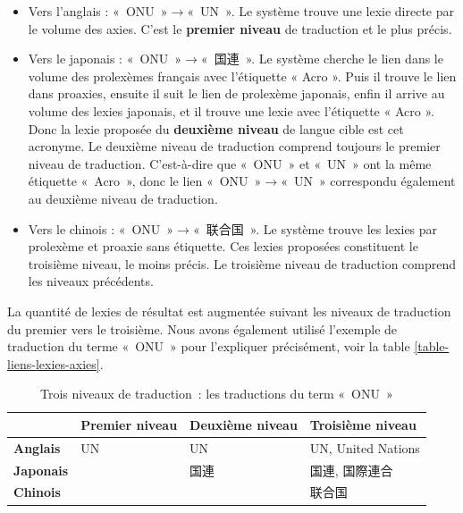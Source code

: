 \documentclass[10pt,a4paper,twoside]{article}
\newcommand{\Chinois}[1]{{\fontspec[Scale=0.9]{STSong}#1}}
\newcommand{\Japonais}[1]{{\fontspec[Scale=0.9]{Hiragino Kaku Gothic Pro}#1}}
\begin{document}
\begin{itemize}
\item Vers l’anglais : « ONU »\ensuremath{\to}« UN ». Le système trouve une lexie directe par le volume des axies. C’est le \textbf{premier niveau} de traduction et le plus précis.
\item Vers le japonais : « ONU »\ensuremath{\to}« \Japonais{国連} ». Le système cherche le lien dans le volume des prolexèmes français avec l’étiquette « Acro ». Puis il trouve le lien dans proaxies, ensuite il suit le lien de prolexème japonais, enfin il arrive au volume des lexies japonais, et il trouve une lexie avec l’étiquette « Acro ». Donc la lexie proposée du \textbf{deuxième niveau} de langue cible est cet acronyme. Le deuxième niveau de traduction comprend toujours le premier niveau de traduction. C'est-à-dire que « ONU » et « UN » ont la même étiquette « Acro », donc le lien « ONU »\ensuremath{\to}« UN » correspondu également au deuxième niveau de traduction.
\item Vers le chinois : « ONU »\ensuremath{\to}« \Chinois{联合国} ». Le système trouve les lexies par prolexème et proaxie sans étiquette. Ces lexies proposées constituent le troisième niveau, le moins précis. Le troisième niveau de traduction comprend les niveaux précédents.
\end{itemize}
La quantité de lexies de résultat est augmentée suivant les niveaux de traduction du premier vers le troisième. Nous avons également utilisé l'exemple de traduction du terme « ONU » pour l'expliquer précisément, voir la table \ref{table-liens-lexies-axies}.

\begin{table}[!h]
\centering
	\begin{tabular}{|l|l|l|l|}
	\hline
	\textbf{} & \textbf{Premier niveau} & \textbf{Deuxième niveau} & \textbf{Troisième niveau} \\
	\hline
	\textbf{Anglais} & UN & UN & UN, United Nations \\
	\hline
	\textbf{Japonais} &  & \Japonais{国連} &\Japonais{国連}, \Japonais{国際連合} \\
	\hline
	\textbf{Chinois} & & &\Chinois{联合国}  \\
	\hline
	\end{tabular}
\caption{ Trois niveaux de traduction : les traductions du term « ONU » }\label{table-3-niveaux-traduction}
\end{table}
\end{document}
